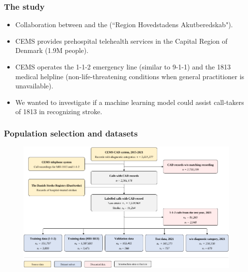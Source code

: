 \begin{frame}
    \frametitle{The study}
    \begin{itemize}
        \item Collaboration between  and the  (``Region Hovedstadens Akutberedskab").
        \item CEMS provides prehospital telehealth services in the Capital Region of Denmark (1.9M people).
        \item CEMS operates the 1-1-2 emergency line (similar to 9-1-1) and the 1813 medical helpline (non-life-threatening conditions when general practitioner is unavailable).
        \vspace{1em}
        \item We wanted to investigate if a machine learning model could assist call-takers of 1813 in recognizing stroke.
    \end{itemize}
\end{frame}


\begin{frame}
    \frametitle{Population selection and datasets}
    \begin{figure}
        \centering
        \includegraphics[width=0.65\paperwidth]{../graphics/paper_retrospective/data_flowchart.pdf}
    \end{figure}

\end{frame}


